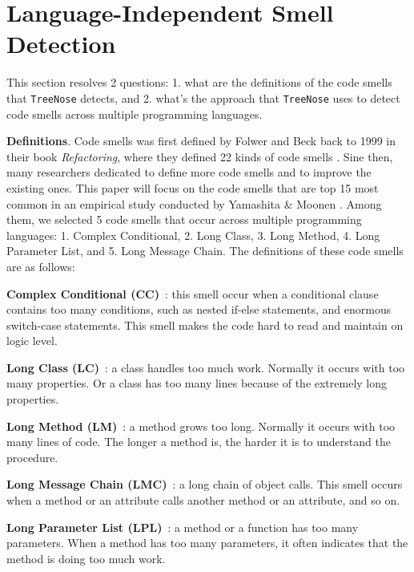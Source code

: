 


\vspace*{-0.5em}

\section{Language-Independent Smell Detection}

\vspace*{-0.1em}

This section resolves 2 questions: 1. what are the definitions of the code
smells that \texttt{TreeNose} detects, and 2. what's the approach that
\texttt{TreeNose} uses to detect code smells across multiple programming
languages.

{\bf Definitions}. Code smells was first defined by Folwer and Beck back to 1999
in their book \textit{Refactoring}, where they defined 22 kinds of code smells
\cite{Fowler_Beck}. Sine then, many researchers dedicated to define more code
smells and to improve the existing ones. This paper will focus on the code
smells that are top 15 most common in an empirical study conducted by Yamashita
\& Moonen \cite{developersCare}. Among them, we selected 5 code smells that
occur across multiple programming languages: 1. Complex Conditional, 2. Long
Class, 3. Long Method, 4. Long Parameter List, and 5. Long Message Chain. The
definitions of these code smells are as follows:

\textbf{Complex Conditional (CC)}~\cite{Fowler_Beck}: this smell occur when a
conditional clause contains too many conditions, such as nested if-else
statements, and enormous switch-case statements. This smell makes the code hard
to read and maintain on logic level.

\textbf{Long Class (LC)}~\cite{Fowler_Beck}: a class handles too much work.
Normally it occurs with too many properties. Or a class has too many lines
because of the extremely long properties.

\textbf{Long Method (LM)}~\cite{Fowler_Beck}: a method grows too long. Normally
it occurs with too many lines of code. The longer a method is, the harder it is
to understand the procedure.

\textbf{Long Message Chain (LMC)}~\cite{Fowler_Beck}: a long chain of object
calls. This smell occurs when a method or an attribute calls another method or
an attribute, and so on.

\textbf{Long Parameter List (LPL)}~\cite{Fowler_Beck}: a method or a function
has too many parameters. When a method has too many parameters, it often
indicates that the method is doing too much work.

